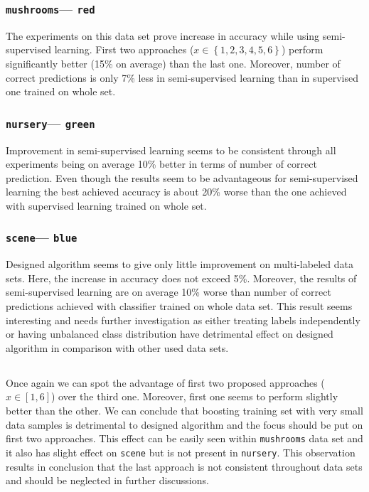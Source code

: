 \documentclass[12pt, a4paper, pdflatex]{report}
\begin{document}
\subsubsection{\texttt{mushrooms}--- \texttt{red}}
The experiments on this data set prove increase in accuracy while using semi-supervised learning. First two approaches ($x \in \left \{ 1, 2, 3 ,4, 5, 6 \right \}$) perform significantly better (15\% on average) than the last one. Moreover, number of correct predictions is only 7\% less in semi-supervised learning than in supervised one trained on whole set.

\subsubsection{\texttt{nursery}--- \texttt{green}}
Improvement in semi-supervised learning seems to be consistent through all experiments being on average 10\% better in terms of number of correct prediction. Even though the results seem to be advantageous for semi-supervised learning the best achieved accuracy is about 20\% worse than the one achieved with supervised learning trained on whole set.

\subsubsection{\texttt{scene}--- \texttt{blue}}
Designed algorithm seems to give only little improvement on multi-labeled data sets. Here, the increase in accuracy does not exceed 5\%. Moreover, the results of semi-supervised learning are on average 10\% worse than number of correct predictions achieved with classifier trained on whole data set. This result seems interesting and needs further investigation as either treating labels independently or having unbalanced class distribution have detrimental effect on designed algorithm in comparison with other used data sets.

\subsection*{}
Once again we can spot the advantage of first two proposed approaches ($x \in \left [ 1,6   \right ] $) over the third one. Moreover, first one seems to perform slightly better than the other. We can conclude that boosting training set with very small data samples is detrimental to designed algorithm and the focus should be put on first two approaches. This effect can be easily seen within \texttt{mushrooms} data set and it also has slight effect on \texttt{scene} but is not present in \texttt{nursery}. This observation results in conclusion that the last approach is not consistent throughout data sets and should be neglected in further discussions.\\
\end{document}
